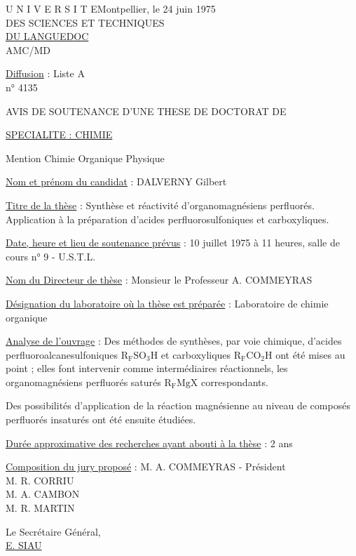 U N I V E R S I T E\hfill Montpellier, le 24 juin 1975\\
DES SCIENCES ET TECHNIQUES\\
\uline{DU LANGUEDOC}\\
AMC/MD

\uline{Diffusion} : Liste A\\
n° 4135

AVIS DE SOUTENANCE D'UNE THESE DE DOCTORAT DE

\uline{SPECIALITE : CHIMIE}

Mention Chimie Organique Physique

\uline{Nom et prénom du candidat} : DALVERNY Gilbert

\uline{Titre de la thèse} : Synthèse et réactivité d'organomagnésiens perfluorés. Application à la préparation d'acides perfluorosulfoniques et carboxyliques.

\uline{Date, heure et lieu de soutenance prévus} : 10 juillet 1975 à 11 heures, salle de cours n° 9 - U.S.T.L.

\uline{Nom du Directeur de thèse} : Monsieur le Professeur A. COMMEYRAS

\uline{Désignation du laboratoire où la thèse est préparée} : Laboratoire de chimie organique

\uline{Analyse de l'ouvrage} : Des méthodes de synthèses, par voie chimique, d'acides perfluoroalcanesulfoniques $\mathrm{R_FSO_3H}$ et carboxyliques $\mathrm{R_FCO_2H}$ ont été mises au point ; elles font intervenir comme intermédiaires réactionnels, les organomagnésiens perfluorés saturés $\mathrm{R_FMgX}$ correspondants.

Des possibilités d'application de la réaction magnésienne au niveau de composés perfluorés insaturés ont été ensuite étudiées.

\uline{Durée approximative des recherches ayant abouti à la thèse} : 2 ans

\uline{Composition du jury proposé} : M. A. COMMEYRAS - Président\\
M. R. CORRIU\\
M. A. CAMBON\\
M. R. MARTIN

Le Secrétaire Général,\\
\uline{E. SIAU}

